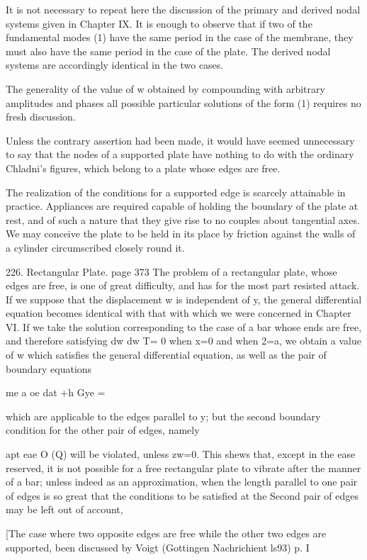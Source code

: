 It is not necessary to repeat here the discussion of the primary and
derived nodal systems given in Chapter IX. It is enough to observe that
if two of the fundamental modes (1) have the same period in the case of
the membrane, they must also have the same period in the case of the
plate. The derived nodal systems are accordingly identical in the two
cases.

The generality of the value of w obtained by compounding with arbitrary
amplitudes and phases all possible particular solutions of the form (1)
requires no fresh discussion.

Unless the contrary assertion had been made, it would have seemed
unnecessary to say that the nodes of a supported plate have nothing to
do with the ordinary Chladni's figures, which belong to a plate whose
edges are free.

The realization of the conditions for a supported edge is scarcely
attainable in practice. Appliances are required capable of holding the
boundary of the plate at rest, and of such a nature that they give rise
to no couples about tangential axes. We may conceive the plate to be
held in its place by friction against the walls of a cylinder
circumscribed closely round it.


226. Rectangular Plate. page 373
The problem of a rectangular plate, whose edges are free, is one of
great difficulty, and has for the most part resisted attack. If we
suppose that the displacement w is independent of y, the general
differential equation becomes identical with that with which we were
concerned in Chapter VI. If we take the solution corresponding to the
case of a bar whose ends are free, and therefore satisfying
dw dw
T= 0
when x=0 and when 2=a, we obtain a value of w which satisfies the
general differential equation, as well as the pair of boundary equations

me a oe dat +h Gye =

which are applicable to the edges parallel to y; but the second boundary
condition for the other pair of edges, namely

apt eae O (Q) will be violated, unless zw=0. This shews that, except in
the ease reserved, it is not possible for a free rectangular plate to
vibrate after the manner of a bar; unless indeed as an approximation,
when the length parallel to one pair of edges is so great that the
conditions to be satisfied at the Second pair of edges may be left out
of account,

[The case where two opposite edges are free while the other two edges are
supported, been discussed by Voigt (Gottingen Nachrichient ls93) p. I

